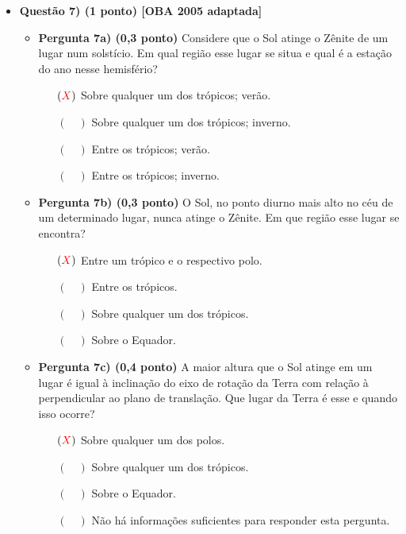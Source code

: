 \documentclass[a4paper, 12pt]{article}
\newcommand{\red}[1]{\textcolor{red}{#1}}
\begin{document}
\begin{flushleft}
\begin{itemize}
            \item \textbf{Questão 7) (1 ponto) [OBA 2005 adaptada]}
                \begin{itemize}
                    \item \textbf{Pergunta 7a) (0,3 ponto)} Considere que o Sol atinge o Zênite de um lugar num solstício. Em qual região esse lugar se situa e qual é a estação do ano nesse hemisfério?
                        \begin{itemize}
                            \item[$(\red{X})$] Sobre qualquer um dos trópicos; verão.
                            \item[$(\quad)$] Sobre qualquer um dos trópicos; inverno.
                            \item[$(\quad)$] Entre os trópicos; verão.
                            \item[$(\quad)$] Entre os trópicos; inverno.
                        \end{itemize}
                    \item \textbf{Pergunta 7b) (0,3 ponto)} O Sol, no ponto diurno mais alto no céu de um determinado lugar, nunca atinge o Zênite. Em que região esse lugar se encontra?
                        \begin{itemize}
                            \item[$(\red{X})$] Entre um trópico e o respectivo polo.
                            \item[$(\quad)$] Entre os trópicos.
                            \item[$(\quad)$] Sobre qualquer um dos trópicos.
                            \item[$(\quad)$] Sobre o Equador.
                        \end{itemize}
                    \item \textbf{Pergunta 7c) (0,4 ponto)} A maior altura que o Sol atinge em um lugar é igual à inclinação do eixo de rotação da Terra com relação à perpendicular ao plano de translação. Que lugar da Terra é esse e quando isso ocorre?
                        \begin{itemize}
                            \item[$(\red{X})$] Sobre qualquer um dos polos.
                            \item[$(\quad)$] Sobre qualquer um dos trópicos.
                            \item[$(\quad)$] Sobre o Equador.
                            \item[$(\quad)$] Não há informações suficientes para responder esta pergunta.
                        \end{itemize}
                \end{itemize}
        \end{itemize} \end{flushleft}
\end{document}
